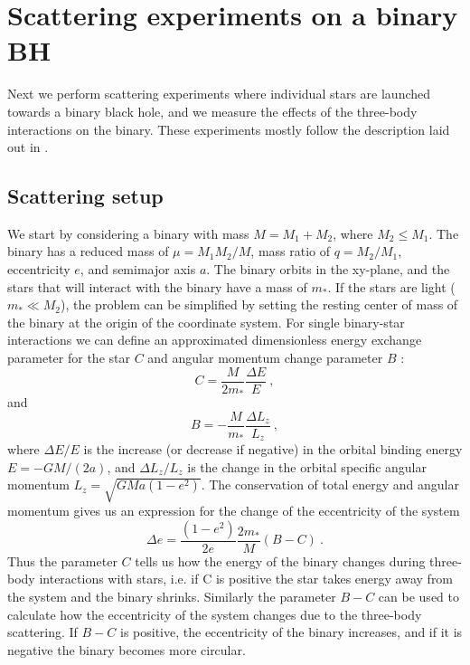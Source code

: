 \documentclass[english, oneside]{HYgradu}
\begin{document}
\section{Scattering experiments on a binary BH}

Next we perform scattering experiments where individual stars are launched towards a binary black hole, and we measure the effects of the three-body interactions on the binary.
These experiments mostly follow the description laid out in \cite{sesana:2006}.

\subsection{Scattering setup}

We start by considering a binary with mass $M = M_1 + M_2$, where $M_2 \leq M_1$. The binary has a reduced mass of $\mu = M_1 M_2 / M$, mass ratio of $q = M_2/M_1$, eccentricity $e$, and semimajor axis $a$. The binary orbits in the xy-plane, and the stars that will interact with the binary have a mass of $m_{\ast}$. If the stars are light ($m_{\ast} \ll M_2$), the problem can be simplified by setting the resting center of mass of the binary at the origin of the coordinate system. For single binary-star interactions we can define an approximated dimensionless energy exchange parameter for the star $C$ and angular momentum change parameter $B$ \citep{hills:1983}:
\begin{equation}
C = \frac{M}{2m_{\ast}} \frac{\Delta E}{E} \ ,
\end{equation}
and 
\begin{equation}
B = - \frac{M}{m_{\ast}} \frac{\Delta L_z}{L_z} \ ,
\end{equation}
where $\Delta E / E$ is the increase (or decrease if negative) in the orbital binding energy $E = -GM/(2a)$, and $\Delta L_z / L_z$ is the change in the orbital specific angular momentum $L_z = \sqrt{GMa(1-e^2)}$. The conservation of total energy and angular momentum gives us an expression for the change of the eccentricity of the system
\begin{equation}
\Delta e = \frac{(1-e^2)}{2e} \frac{2 m_{\ast}}{M} (B-C) \ .
\end{equation}
Thus the parameter $C$ tells us how the energy of the binary changes during three-body interactions with stars, i.e. if C is positive the star takes energy away from the system and the binary shrinks. Similarly the parameter $B-C$ can be used to calculate how the eccentricity of the system changes due to the three-body scattering. If $B-C$ is positive, the eccentricity of the binary increases, and if it is negative the binary becomes more circular.
\end{document}
